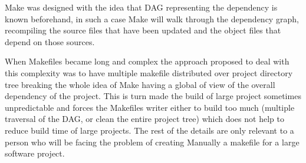 Make was designed with the idea that DAG representing the dependency is known beforehand, in such a case 
Make will walk through the dependency graph, recompiling the source files that have been updated and the object 
files that depend on those sources. 

When Makefiles became long and complex the approach proposed to deal with this complexity was to have multiple
makefile distributed over project directory tree breaking the whole idea of Make having a global of view of the
overall dependency of the project. This is turn made the build of large project sometimes unpredictable and 
forces the Makefiles writer either to build too much (multiple traversal of the DAG, or clean the entire project tree)
which does not help to reduce build time of large projects. The rest of the details are only relevant to a person 
who will be facing the problem of creating Manually a makefile for a large software project.